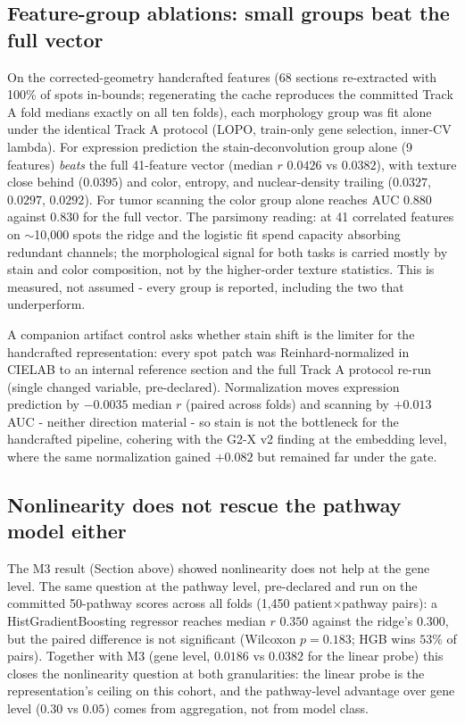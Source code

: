 \documentclass[11pt]{article}
\begin{document}
\subsection{Feature-group ablations: small groups beat the full vector}
On the corrected-geometry handcrafted features (68 sections re-extracted with
100\% of spots in-bounds; regenerating the cache reproduces the committed
Track A fold medians exactly on all ten folds), each morphology group was fit
alone under the identical Track A protocol (LOPO, train-only gene selection,
inner-CV lambda). For expression prediction the stain-deconvolution group
alone (9 features) \emph{beats} the full 41-feature vector (median $r$
$0.0426$ vs $0.0382$), with texture close behind ($0.0395$) and color,
entropy, and nuclear-density trailing ($0.0327$, $0.0297$, $0.0292$). For
tumor scanning the color group alone reaches AUC $0.880$ against $0.830$ for
the full vector. The parsimony reading: at 41 correlated features on
$\sim$10{,}000 spots the ridge and the logistic fit spend capacity
absorbing redundant channels; the morphological signal for both tasks is
carried mostly by stain and color composition, not by the higher-order
texture statistics. This is measured, not assumed - every group is reported,
including the two that underperform.

A companion artifact control asks whether stain shift is the limiter for the
handcrafted representation: every spot patch was Reinhard-normalized in CIELAB
to an internal reference section and the full Track A protocol re-run
(single changed variable, pre-declared). Normalization moves expression
prediction by $-0.0035$ median $r$ (paired across folds) and scanning by
$+0.013$ AUC - neither direction material - so stain is not the bottleneck
for the handcrafted pipeline, cohering with the G2-X v2 finding at the
embedding level, where the same normalization gained $+0.082$ but remained
far under the gate.

\subsection{Nonlinearity does not rescue the pathway model either}
The M3 result (Section above) showed nonlinearity does not help at the gene
level. The same question at the pathway level, pre-declared and run on the
committed 50-pathway scores across all folds (1,450 patient$\times$pathway
pairs): a HistGradientBoosting regressor reaches median $r$ $0.350$ against
the ridge's $0.300$, but the paired difference is not significant (Wilcoxon
$p=0.183$; HGB wins $53\%$ of pairs). Together with M3 (gene level,
$0.0186$ vs $0.0382$ for the linear probe) this closes the nonlinearity
question at both granularities: the linear probe is the representation's
ceiling on this cohort, and the pathway-level advantage over gene level
($0.30$ vs $0.05$) comes from aggregation, not from model class.
\end{document}
